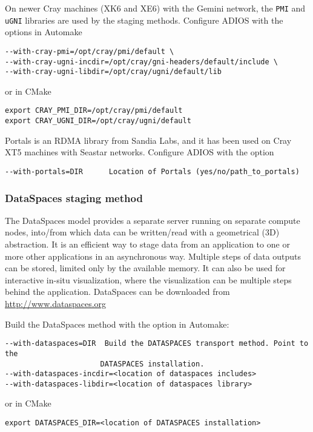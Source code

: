 \vspace*{6pt}
On newer Cray machines (XK6 and XE6) with the Gemini network, the \verb+PMI+ and \verb+uGNI+ libraries are used by the staging methods. Configure ADIOS with the options in Automake

\begin{lstlisting}
--with-cray-pmi=/opt/cray/pmi/default \
--with-cray-ugni-incdir=/opt/cray/gni-headers/default/include \
--with-cray-ugni-libdir=/opt/cray/ugni/default/lib
\end{lstlisting}

\noindent or in CMake
\begin{lstlisting}
export CRAY_PMI_DIR=/opt/cray/pmi/default
export CRAY_UGNI_DIR=/opt/cray/ugni/default
\end{lstlisting}

\vspace*{6pt}
Portals is an RDMA library from Sandia Labs, and it has been used on Cray XT5 machines with Seastar networks. Configure ADIOS with the option

\verb+--with-portals=DIR      Location of Portals (yes/no/path_to_portals)+

\subsubsection{DataSpaces staging method}
The DataSpaces model provides a separate server running on separate compute nodes, into/from which data can be written/read with a geometrical (3D) abstraction. It is an efficient way to stage data from an application to one or more other applications in an asynchronous way. Multiple steps of data outputs can be stored, limited only by the available memory. 
It can also be used for interactive in-situ visualization, where the visualization can be multiple steps behind the application. 
DataSpaces can be downloaded from \url{http://www.dataspaces.org}

\noindent Build the DataSpaces method with the option in Automake:

\begin{lstlisting}
--with-dataspaces=DIR  Build the DATASPACES transport method. Point to the
                      DATASPACES installation.
--with-dataspaces-incdir=<location of dataspaces includes>
--with-dataspaces-libdir=<location of dataspaces library>
\end{lstlisting}

\noindent or in CMake
\begin{lstlisting}
export DATASPACES_DIR=<location of DATASPACES installation>
\end{lstlisting}

